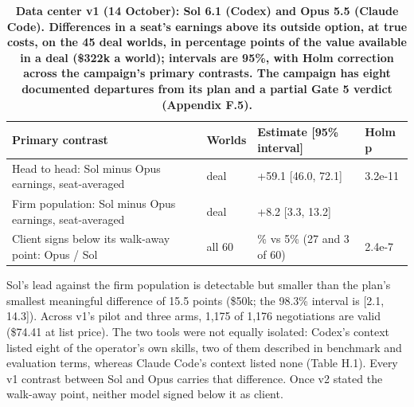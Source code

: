\renewcommand{\thetable}{E.16}
\begin{longtable}[]{@{}
  >{\raggedright\arraybackslash}p{}
  >{\raggedleft\arraybackslash}p{}
  >{\raggedright\arraybackslash}p{}
  >{\raggedleft\arraybackslash}p{}@{}}
\caption{\textbf{Data center v1 (14 October): Sol 6.1 (Codex) and Opus 5.5 (Claude Code). Differences in a seat's earnings above its outside option, at true costs, on the 45 deal worlds, in percentage points of the value available in a deal (\$322k a world); intervals are 95\%, with Holm correction across the campaign's primary contrasts. The campaign has eight documented departures from its plan and a partial Gate 5 verdict (Appendix F.5).}}\label{tab:E.16}\tabularnewline
\toprule\noalign{}
\begin{minipage}[b]{\linewidth}\raggedright
Primary contrast
\end{minipage} & \begin{minipage}[b]{\linewidth}\raggedleft
Worlds
\end{minipage} & \begin{minipage}[b]{\linewidth}\raggedright
Estimate {[}95\% interval{]}
\end{minipage} & \begin{minipage}[b]{\linewidth}\raggedleft
Holm p
\end{minipage} \\
\midrule\noalign{}
\endhead
\bottomrule\noalign{}
\endlastfoot
Head to head: Sol minus Opus earnings, seat-averaged & 45 deal & +59.1 {[}46.0, 72.1{]} & 3.2e-11 \\
Firm population: Sol minus Opus earnings, seat-averaged & 45 deal & +8.2 {[}3.3, 13.2{]} & 0.0017 \\
Client signs below its walk-away point: Opus / Sol & all 60 & 45\% vs 5\% (27 and 3 of 60) & 2.4e-7 \\
\end{longtable}

Sol's lead against the firm population is detectable but smaller than the plan's smallest meaningful difference
of 15.5 points (\$50k; the 98.3\% interval is {[}2.1, 14.3{]}). Across v1's pilot and three arms, 1,175 of 1,176
negotiations are valid (\$74.41 at list price). The two tools were not equally isolated: Codex's context listed eight
of the operator's own skills, two of them described in benchmark and evaluation terms, whereas Claude Code's context
listed none (Table H.1). Every v1 contrast between Sol and Opus carries that difference. Once v2 stated the
walk-away point, neither model signed below it as client.

